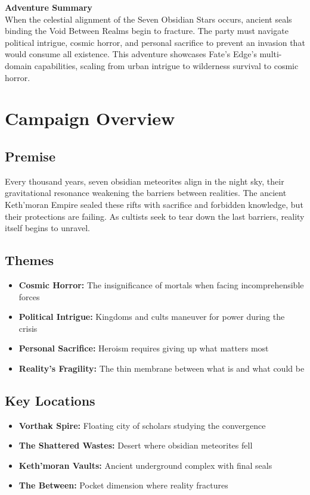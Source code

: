 \documentclass[12pt,twoside]{article}
\newenvironment{adventurebox}[1]{%
  \begin{shaded}%
  \textbf{\large #1}\\%
}{\end{shaded}}
\begin{document}




\begin{adventurebox}{Adventure Summary}
When the celestial alignment of the Seven Obsidian Stars occurs, ancient seals binding the Void Between Realms begin to fracture. The party must navigate political intrigue, cosmic horror, and personal sacrifice to prevent an invasion that would consume all existence. This adventure showcases Fate's Edge's multi-domain capabilities, scaling from urban intrigue to wilderness survival to cosmic horror.
\end{adventurebox}


\section{Campaign Overview}

\subsection{Premise}
Every thousand years, seven obsidian meteorites align in the night sky, their gravitational resonance weakening the barriers between realities. The ancient Keth'moran Empire sealed these rifts with sacrifice and forbidden knowledge, but their protections are failing. As cultists seek to tear down the last barriers, reality itself begins to unravel.

\subsection{Themes}
\begin{itemize}[leftmargin=*]
\item \textbf{Cosmic Horror:} The insignificance of mortals when facing incomprehensible forces
\item \textbf{Political Intrigue:} Kingdoms and cults maneuver for power during the crisis
\item \textbf{Personal Sacrifice:} Heroism requires giving up what matters most
\item \textbf{Reality's Fragility:} The thin membrane between what is and what could be
\end{itemize}

\subsection{Key Locations}
\begin{itemize}[leftmargin=*]
\item \textbf{Vorthak Spire:} Floating city of scholars studying the convergence
\item \textbf{The Shattered Wastes:} Desert where obsidian meteorites fell
\item \textbf{Keth'moran Vaults:} Ancient underground complex with final seals
\item \textbf{The Between:} Pocket dimension where reality fractures
\end{itemize}
\end{document}
